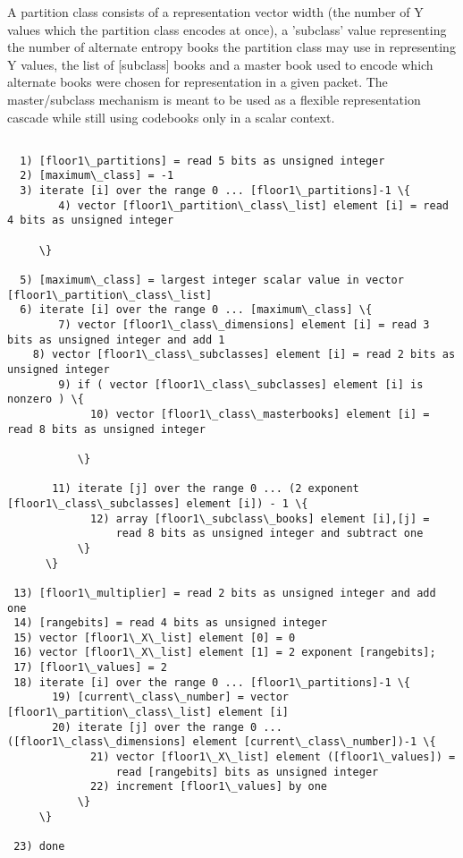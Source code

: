 A partition class consists of a representation vector width (the
number of Y values which the partition class encodes at once), a
'subclass' value representing the number of alternate entropy books
the partition class may use in representing Y values, the list of
[subclass] books and a master book used to encode which alternate
books were chosen for representation in a given packet.  The
master/subclass mechanism is meant to be used as a flexible
representation cascade while still using codebooks only in a scalar
context.

\begin{Verbatim}[commandchars=\\\{\}]

  1) [floor1\_partitions] = read 5 bits as unsigned integer
  2) [maximum\_class] = -1
  3) iterate [i] over the range 0 ... [floor1\_partitions]-1 \{
        4) vector [floor1\_partition\_class\_list] element [i] = read 4 bits as unsigned integer

     \}

  5) [maximum\_class] = largest integer scalar value in vector [floor1\_partition\_class\_list]
  6) iterate [i] over the range 0 ... [maximum\_class] \{
        7) vector [floor1\_class\_dimensions] element [i] = read 3 bits as unsigned integer and add 1
	8) vector [floor1\_class\_subclasses] element [i] = read 2 bits as unsigned integer
        9) if ( vector [floor1\_class\_subclasses] element [i] is nonzero ) \{
             10) vector [floor1\_class\_masterbooks] element [i] = read 8 bits as unsigned integer

           \}

       11) iterate [j] over the range 0 ... (2 exponent [floor1\_class\_subclasses] element [i]) - 1 \{
             12) array [floor1\_subclass\_books] element [i],[j] =
                 read 8 bits as unsigned integer and subtract one
           \}
      \}

 13) [floor1\_multiplier] = read 2 bits as unsigned integer and add one
 14) [rangebits] = read 4 bits as unsigned integer
 15) vector [floor1\_X\_list] element [0] = 0
 16) vector [floor1\_X\_list] element [1] = 2 exponent [rangebits];
 17) [floor1\_values] = 2
 18) iterate [i] over the range 0 ... [floor1\_partitions]-1 \{
       19) [current\_class\_number] = vector [floor1\_partition\_class\_list] element [i]
       20) iterate [j] over the range 0 ... ([floor1\_class\_dimensions] element [current\_class\_number])-1 \{
             21) vector [floor1\_X\_list] element ([floor1\_values]) =
                 read [rangebits] bits as unsigned integer
             22) increment [floor1\_values] by one
           \}
     \}

 23) done
\end{Verbatim}

